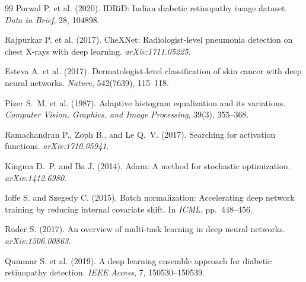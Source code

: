 \documentclass[12pt,a4paper]{article}
\begin{document}
\begin{thebibliography}{99}
Porwal P. et al. (2020).
IDRiD: Indian diabetic retinopathy image dataset.
\emph{Data in Brief}, 28, 104898.

Rajpurkar P. et al. (2017).
CheXNet: Radiologist-level pneumonia detection on chest X-rays with deep learning.
\emph{arXiv:1711.05225}.

Esteva A. et al. (2017).
Dermatologist-level classification of skin cancer with deep neural networks.
\emph{Nature}, 542(7639), 115--118.

Pizer S.\ M. et al. (1987).
Adaptive histogram equalization and its variations.
\emph{Computer Vision, Graphics, and Image Processing}, 39(3), 355--368.

Ramachandran P., Zoph B., and Le Q.\ V. (2017).
Searching for activation functions.
\emph{arXiv:1710.05941}.

Kingma D.\ P. and Ba J. (2014).
Adam: A method for stochastic optimization.
\emph{arXiv:1412.6980}.

Ioffe S. and Szegedy C. (2015).
Batch normalization: Accelerating deep network training by reducing internal covariate shift.
In \emph{ICML}, pp.\ 448--456.

Ruder S. (2017).
An overview of multi-task learning in deep neural networks.
\emph{arXiv:1506.00863}.

Qummar S. et al. (2019).
A deep learning ensemble approach for diabetic retinopathy detection.
\emph{IEEE Access}, 7, 150530--150539.


\end{thebibliography}
\end{document}
